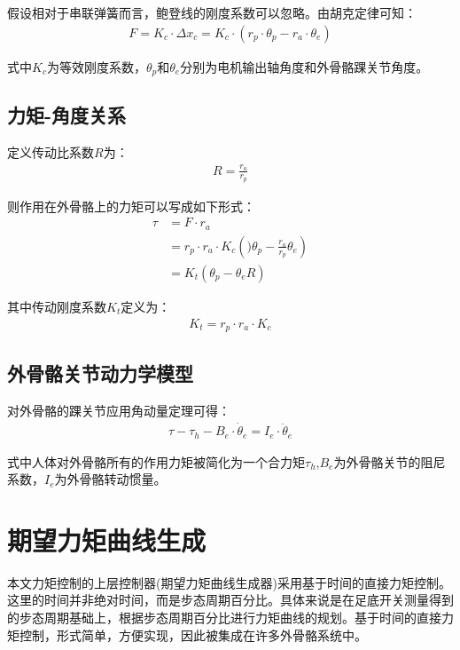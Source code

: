 假设相对于串联弹簧而言，鲍登线的刚度系数可以忽略。由胡克定律可知：
\begin{align}
    F = K_c \cdot \Delta x_c = K_c \cdot (r_p\cdot \theta_p - r_a\cdot \theta_e)
\end{align}

式中$K_c$为等效刚度系数，$\theta_p$和$\theta_e$分别为电机输出轴角度和外骨骼踝关节角度。

\subsection{力矩-角度关系}

定义传动比系数$R$为：
\begin{align}
    R = \frac{r_a}{r_p}
\end{align}

则作用在外骨骼上的力矩可以写成如下形式：
\begin{align}
\tau &=F \cdot r_{a} \\ &=r_{p} \cdot r_{a} \cdot K_{c}\left()\theta_{p}-\frac{r_{a}}{r_{p}} \theta_{e}\right) \\ &=K_{t}\left(\theta_{p}-\theta_{e} R\right) 
\end{align}

其中传动刚度系数$K_t$定义为：
\begin{align}
    K_t = r_p\cdot r_a \cdot K_c
\end{align}

\subsection{外骨骼关节动力学模型}

对外骨骼的踝关节应用角动量定理可得：
\begin{align}
    \tau-\tau_{h}-B_{e} \cdot \dot{\theta}_{e}=I_{e} \cdot \ddot{\theta}_{e}
\end{align}

式中人体对外骨骼所有的作用力矩被简化为一个合力矩$\tau_h$,$B_e$为外骨骼关节的阻尼系数，$I_e$为外骨骼转动惯量。

\section{期望力矩曲线生成}

本文力矩控制的上层控制器(期望力矩曲线生成器)采用基于时间的直接力矩控制。这里的时间并非绝对时间，而是步态周期百分比。具体来说是在足底开关测量得到的步态周期基础上，根据步态周期百分比进行力矩曲线的规划。基于时间的直接力矩控制，形式简单，方便实现，因此被集成在许多外骨骼系统中。

